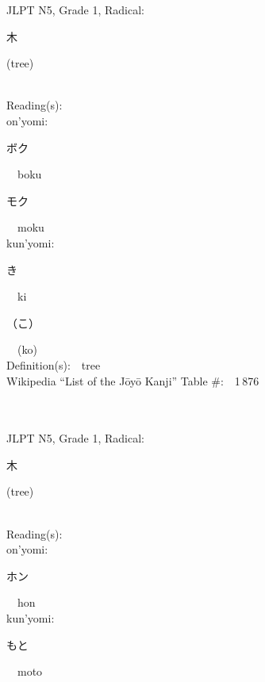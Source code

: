 \begin{multicols}{2}
{JLPT N5, Grade 1, Radical:\ \ {\begin{CJK}{UTF8}{min} 木 \end{CJK}} (tree) } \\
Reading(s):\ \ \\
{\hspace*{1em}}on'yomi:\ \ \\
{\hspace*{2em}}{\begin{CJK}{UTF8}{min} ボク \end{CJK}}\ \ boku\ \ \\
{\hspace*{2em}}{\begin{CJK}{UTF8}{min} モク \end{CJK}}\ \ moku\ \ \\
{\hspace*{1em}}kun'yomi:\ \ \\
{\hspace*{2em}}{\begin{CJK}{UTF8}{min} き \end{CJK}}\ \ ki\ \ \\
{\hspace*{2em}}{\begin{CJK}{UTF8}{min} （こ） \end{CJK}}\ \ (ko)\ \ \\
Definition(s):\ \ tree \\
Wikipedia ``List of the J\=oy\=o Kanji'' Table \#:\ \ 1\,876 \\
\ \ \\
{\fontsize{34pt}{40pt}  }\ \ \\  %
{JLPT N5, Grade 1, Radical:\ \ {\begin{CJK}{UTF8}{min} 木 \end{CJK}} (tree) } \\
Reading(s):\ \ \\
{\hspace*{1em}}on'yomi:\ \ \\
{\hspace*{2em}}{\begin{CJK}{UTF8}{min} ホン \end{CJK}}\ \ hon\ \ \\
{\hspace*{1em}}kun'yomi:\ \ \\
{\hspace*{2em}}{\begin{CJK}{UTF8}{min} もと \end{CJK}}\ \ moto\ \ \\

\end{multicols}
